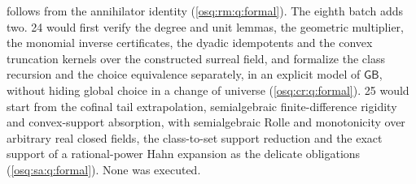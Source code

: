 \documentclass[11pt,letterpaper]{article}
\numberwithin{equation}{section}
\theoremstyle{definition}
\theoremstyle{remark}
\theoremstyle{plain}
\begin{document}
follows from the annihilator identity (\cref{osq:rm:q:formal}). The eighth batch adds two. 24 would first verify the degree and unit lemmas, the
geometric multiplier, the monomial inverse certificates, the dyadic idempotents and the convex truncation kernels over the constructed surreal field, and
formalize the class recursion and the choice equivalence separately, in an explicit model of $\mathsf{GB}$, without hiding global choice in a change of
universe (\cref{osq:cr:q:formal}). 25 would start from the cofinal tail extrapolation, semialgebraic finite-difference rigidity and convex-support
absorption, with semialgebraic Rolle and monotonicity over arbitrary real closed fields, the class-to-set support reduction and the exact support of a
rational-power Hahn expansion as the delicate obligations (\cref{osq:sa:q:formal}). None was executed.
\end{document}
